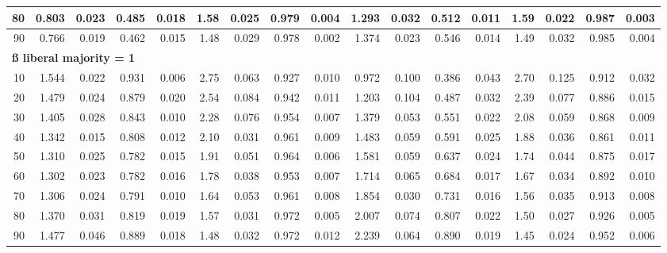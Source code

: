 \documentclass[
]{article}
\begin{document}
\begin{table}[H]
\begin{table}
{\begin{tabular}{r|r|r|r|r|r|r|r|r|r|r|r|r|r|r|r|r}
\hline
\hspace{1em}80 & 0.803 & 0.023 & 0.485 & 0.018 & 1.58 & 0.025 & 0.979 & 0.004 & 1.293 & 0.032 & 0.512 & 0.011 & 1.59 & 0.022 & 0.987 & 0.003\\
\hline
\hspace{1em}90 & 0.766 & 0.019 & 0.462 & 0.015 & 1.48 & 0.029 & 0.978 & 0.002 & 1.374 & 0.023 & 0.546 & 0.014 & 1.49 & 0.032 & 0.985 & 0.004\\
\hline
\multicolumn{17}{l}{\textbf{ß liberal majority = 1}}\\
\hline
\hspace{1em}10 & 1.544 & 0.022 & 0.931 & 0.006 & 2.75 & 0.063 & 0.927 & 0.010 & 0.972 & 0.100 & 0.386 & 0.043 & 2.70 & 0.125 & 0.912 & 0.032\\
\hline
\hspace{1em}20 & 1.479 & 0.024 & 0.879 & 0.020 & 2.54 & 0.084 & 0.942 & 0.011 & 1.203 & 0.104 & 0.487 & 0.032 & 2.39 & 0.077 & 0.886 & 0.015\\
\hline
\hspace{1em}30 & 1.405 & 0.028 & 0.843 & 0.010 & 2.28 & 0.076 & 0.954 & 0.007 & 1.379 & 0.053 & 0.551 & 0.022 & 2.08 & 0.059 & 0.868 & 0.009\\
\hline
\hspace{1em}40 & 1.342 & 0.015 & 0.808 & 0.012 & 2.10 & 0.031 & 0.961 & 0.009 & 1.483 & 0.059 & 0.591 & 0.025 & 1.88 & 0.036 & 0.861 & 0.011\\
\hline
\hspace{1em}50 & 1.310 & 0.025 & 0.782 & 0.015 & 1.91 & 0.051 & 0.964 & 0.006 & 1.581 & 0.059 & 0.637 & 0.024 & 1.74 & 0.044 & 0.875 & 0.017\\
\hline
\hspace{1em}60 & 1.302 & 0.023 & 0.782 & 0.016 & 1.78 & 0.038 & 0.953 & 0.007 & 1.714 & 0.065 & 0.684 & 0.017 & 1.67 & 0.034 & 0.892 & 0.010\\
\hline
\hspace{1em}70 & 1.306 & 0.024 & 0.791 & 0.010 & 1.64 & 0.053 & 0.961 & 0.008 & 1.854 & 0.030 & 0.731 & 0.016 & 1.56 & 0.035 & 0.913 & 0.008\\
\hline
\hspace{1em}80 & 1.370 & 0.031 & 0.819 & 0.019 & 1.57 & 0.031 & 0.972 & 0.005 & 2.007 & 0.074 & 0.807 & 0.022 & 1.50 & 0.027 & 0.926 & 0.005\\
\hline
\hspace{1em}90 & 1.477 & 0.046 & 0.889 & 0.018 & 1.48 & 0.032 & 0.972 & 0.012 & 2.239 & 0.064 & 0.890 & 0.019 & 1.45 & 0.024 & 0.952 & 0.006\\

\end{tabular}}
\end{table}
\end{table}
\end{document}
